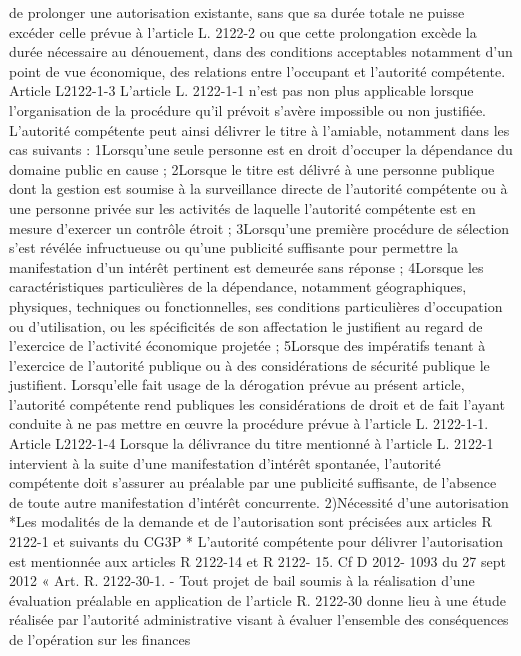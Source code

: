 \documentclass[11pt,a4paper]{report}
\begin{document}
de prolonger une autorisation existante, sans que sa durée totale ne puisse excéder celle prévue à l'article L.
2122-2 ou que cette prolongation excède la durée nécessaire au dénouement, dans des conditions acceptables
notamment d'un point de vue économique, des relations entre l'occupant et l'autorité compétente.
Article L2122-1-3
L'article L. 2122-1-1 n'est pas non plus applicable lorsque l'organisation de la procédure qu'il prévoit s'avère
impossible ou non justifiée. L'autorité compétente peut ainsi délivrer le titre à l'amiable, notamment dans les cas
suivants :
1\degre  Lorsqu'une seule personne est en droit d'occuper la dépendance du domaine public en cause ;
2\degre  Lorsque le titre est délivré à une personne publique dont la gestion est soumise à la surveillance directe de
l'autorité compétente ou à une personne privée sur les activités de laquelle l'autorité compétente est en mesure
d'exercer un contrôle étroit ;
3\degre  Lorsqu'une première procédure de sélection s'est révélée infructueuse ou qu'une publicité suffisante pour
permettre la manifestation d'un intérêt pertinent est demeurée sans réponse ;
4\degre  Lorsque les caractéristiques particulières de la dépendance, notamment géographiques, physiques,
techniques ou fonctionnelles, ses conditions particulières d'occupation ou d'utilisation, ou les spécificités de son
affectation le justifient au regard de l'exercice de l'activité économique projetée ;
5\degre  Lorsque des impératifs tenant à l'exercice de l'autorité publique ou à des considérations de sécurité publique
le justifient.
Lorsqu'elle fait usage de la dérogation prévue au présent article, l'autorité compétente rend publiques les
considérations de droit et de fait l'ayant conduite à ne pas mettre en œuvre la procédure prévue à l'article L.
2122-1-1.
Article L2122-1-4
Lorsque la délivrance du titre mentionné à l'article L. 2122-1 intervient à la suite d'une manifestation d'intérêt
spontanée, l'autorité compétente doit s'assurer au préalable par une publicité suffisante, de l'absence de toute
autre manifestation d'intérêt concurrente.
2)Nécessité d’une autorisation
*Les modalités de la demande et de l’autorisation sont précisées aux articles R 2122-1 et suivants du
CG3P
* L’autorité compétente pour délivrer l’autorisation est mentionnée aux articles R 2122-14 et R 2122-
15.
Cf D 2012- 1093 du 27 sept 2012 « Art. R. 2122-30-1. - Tout projet de bail soumis à la réalisation
d'une évaluation préalable en application de l'article R. 2122-30 donne lieu à une étude réalisée par
l'autorité administrative visant à évaluer l'ensemble des conséquences de l'opération sur les finances
\end{document}
